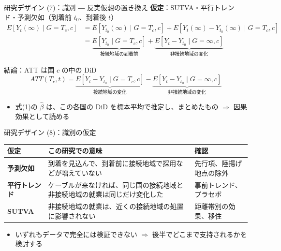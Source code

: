 \documentclass[aspectratio=169,11pt]{beamer}
\begin{document}
\begin{frame}{研究デザイン (7)：識別 ― 反実仮想の置き換え}
  \small
  \textbf{仮定}：\alert{SUTVA・平行トレンド・予測欠如}（到着前 $t_0$、到着後 $t$）
  \[
    \begin{aligned}
      E[Y_t(\infty)\mid G=T_c,c]
      &= E[Y_{t_0}(\infty)\mid G=T_c,c] + E[Y_t(\infty)-Y_{t_0}(\infty)\mid G=T_c,c] \\[1.2em]
      &= \underbrace{E[Y_{t_0}\mid G=T_c,c]}_{\text{接続地域の到着前}}
       + \underbrace{E[Y_t - Y_{t_0}\mid G=\infty,c]}_{\text{非接続地域の変化}}
    \end{aligned}
  \]
  \vspace{0.3em}
    \begin{block}{結論：ATT は国 $c$ の中の DiD}
    \[
      ATT(T_c,t) = \underbrace{E[Y_t - Y_{t_0}\mid G=T_c,c]}_{\text{接続地域の変化}}
      - \underbrace{E[Y_t - Y_{t_0}\mid G=\infty,c]}_{\text{非接続地域の変化}}
    \]
    \vspace{-0.8em}
    \begin{itemize}
      \item 式(1)の $\hat\beta$ は、この各国の DiD を標本平均で推定し、まとめたもの $\Rightarrow$ 因果効果として読める
    \end{itemize}
  \end{block}
\end{frame}
\begin{frame}{研究デザイン (8)：識別の仮定}
  \small
  \renewcommand{\arraystretch}{1.4}
  \begin{tabular}{p{2.6cm}p{6.4cm}p{3.6cm}}
    \toprule
    仮定 & この研究での意味 & 確認 \\
    \midrule
    \textbf{予測欠如}
      & 到着を見込んで、到着前に接続地域で採用などが増えていない
      & 先行項、陸揚げ地点の除外 \\
    \textbf{平行トレンド}
      & ケーブルが来なければ、同じ国の接続地域と非接続地域の就業は同じだけ変化した
      & 事前トレンド、プラセボ \\
    \textbf{SUTVA}
      & 非接続地域の就業は、近くの接続地域の処置に影響されない
      & 距離帯別の効果、移住 \\
    \bottomrule
  \end{tabular}
  \vspace{1em}
  \begin{itemize}
    \item いずれもデータで完全には検証できない $\Rightarrow$ 後半で\alert{どこまで支持されるか}を検討する
  \end{itemize}
\end{frame}
\end{document}
